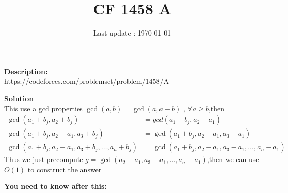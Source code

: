 \documentclass{article}
\begin{document}
\title{\textbf{CF 1458 A}}
\author{}
\date{Last update : \today}

\maketitle

\noindent \textbf{Description:}\\
https://codeforces.com/problemset/problem/1458/A

\noindent \textbf{Solution}\\
This use a gcd properties $\gcd(a,b)=\gcd(a,a-b)\text{ , }\forall a\ge b$,then 
\begin{align*}
	\gcd(a_1+b_j,a_2+b_j)&=gcd(a_1+b_j,a_2-a_1)\\
	\gcd(a_1+b_j,a_2-a_1,a_3+b_j)&=\gcd(a_1+b_j,a_2-a_1,a_3-a_1)\\
	\gcd(a_1+b_j,a_2-a_1,a_3+b_j,\dots,a_n+b_j)&=\gcd(a_1+b_j,a_2-a_1,a_3-a_1,\dots,a_n-a_1)
\end{align*}
Thus we just precompute $g=\gcd(a_2-a_1,a_3-a_1,\dots,a_n-a_1)$,then we can use $O(1)$ to construct the answer

\noindent \textbf{You need to know after this:}\\
\end{document}
